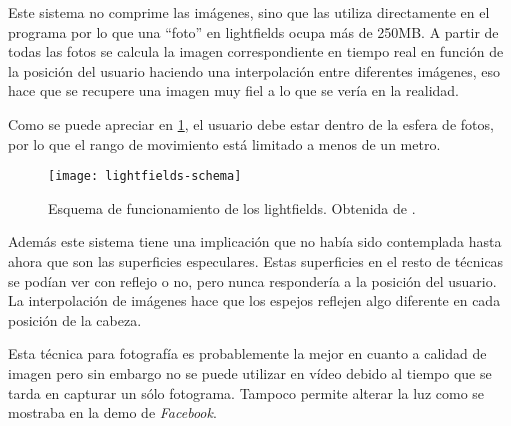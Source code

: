 Este sistema no comprime las imágenes, sino que las utiliza directamente en el programa por lo que una ``foto'' en lightfields ocupa más de 250MB. A partir de todas las fotos se calcula la imagen correspondiente en tiempo real en función de la posición del usuario haciendo una interpolación entre diferentes imágenes, eso hace que se recupere una imagen muy fiel a lo que se vería en la realidad.

Como se puede apreciar en \ref{fig:lightfields-schema}, el usuario debe estar dentro de la esfera de fotos, por lo que el rango de movimiento está limitado a menos de un metro.

\begin{figure}[h]
  \centering
	\texttt{[image: lightfields-schema]}
  \caption{Esquema de funcionamiento de los lightfields. Obtenida de \cite{GoogleLightfields}.}
  \label{fig:lightfields-schema}
\end{figure}

Además este sistema tiene una implicación que no había sido contemplada hasta ahora que son las superficies especulares. Estas superficies en el resto de técnicas se podían ver con reflejo o no, pero nunca respondería a la posición del usuario. La interpolación de imágenes hace que los espejos reflejen algo diferente en cada posición de la cabeza.

Esta técnica para fotografía es probablemente la mejor en cuanto a calidad de imagen pero sin embargo no se puede utilizar en vídeo debido al tiempo que se tarda en capturar un sólo fotograma. Tampoco permite alterar la luz como se mostraba en la demo de \textit{Facebook}.











